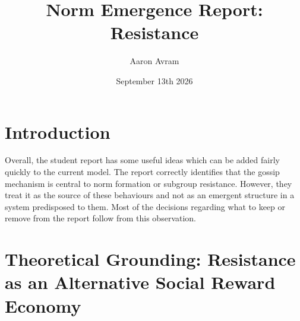 \documentclass[12pt]{article}
\title{Norm Emergence Report: Resistance}
\author{Aaron Avram}
\date{September 13th 2026}
\begin{document}
\theoremstyle{plain}
\newtheorem{theorem}{Theorem}
\newtheorem{proposition}{Proposition}
\newtheorem{lemma}[theorem]{Lemma}
\newtheorem{corollary}[theorem]{Corollary}
\newtheorem{claim}[theorem]{Claim}

\theoremstyle{definition}
\newtheorem{definition}{Definition}
\newtheorem{example}{Example}
\newtheorem{exercise}[theorem]{Exercise}

\theoremstyle{remark}
\newtheorem{remark}[theorem]{Remark}
\newtheorem{note}[theorem]{Note}

\maketitle

\section{Introduction}
Overall, the student report has some useful ideas which can be added fairly quickly to the current model.
The report correctly identifies that the gossip mechanism is central to norm formation or subgroup resistance.
However, they treat it as the source of these behaviours and not as an emergent structure in a system predisposed to
them. Most of the decisions regarding what to keep or remove from the report follow from this observation.

\section{Theoretical Grounding: Resistance as an Alternative Social Reward Economy}
\end{document}

